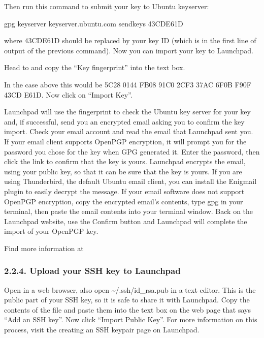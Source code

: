 \documentclass[letterpaper,10pt,english]{sphinxmanual}
\begin{document}
\sphinxAtStartPar
Then run this command to submit your key to Ubuntu keyserver:

\begin{sphinxVerbatim}[commandchars=\\\{\}]
\PYGZdl{} gpg \PYGZhy{}\PYGZhy{}keyserver keyserver.ubuntu.com \PYGZhy{}\PYGZhy{}send\PYGZhy{}keys 43CDE61D
\end{sphinxVerbatim}

\sphinxAtStartPar
where 43CDE61D should be replaced by your key ID (which is in the first line of output of the previous command). Now you can import your key to Launchpad.

\sphinxAtStartPar
Head to  and copy the “Key fingerprint” into the text box.

\sphinxAtStartPar
In the case above this would be 5C28 0144 FB08 91C0 2CF3  37AC 6F0B F90F 43CD E61D.
Now click on “Import Key”.

\sphinxAtStartPar
Launchpad will use the fingerprint to check the Ubuntu key server for your key and, if successful, send you an encrypted email asking you to confirm the key import. Check your email account and read the email that Launchpad sent you. If your email client supports OpenPGP encryption, it will prompt you for the password you chose for the key when GPG generated it. Enter the password, then click the link to confirm that the key is yours.
Launchpad encrypts the email, using your public key, so that it can be sure that the key is yours. If you are using Thunderbird, the default Ubuntu email client, you can install the Enigmail plugin to easily decrypt the message. If your email software does not support OpenPGP encryption, copy the encrypted email’s contents, type gpg in your terminal, then paste the email contents into your terminal window.
Back on the Launchpad website, use the Confirm button and Launchpad will complete the import of your OpenPGP key.

\sphinxAtStartPar
Find more information at 


\subsubsection{2.2.4. Upload your SSH key to Launchpad}
\label{\detokenize{docs/packaging-guide/getting-started:upload-your-ssh-key-to-launchpad}}
\sphinxAtStartPar
Open  in a web browser, also open \textasciitilde{}/.ssh/id\_rsa.pub in a text editor. This is the public part of your SSH key, so it is safe to share it with Launchpad. Copy the contents of the file and paste them into the text box on the web page that says “Add an SSH key”. Now click “Import Public Key”.
For more information on this process, visit the creating an SSH keypair page on Launchpad.
\end{document}
